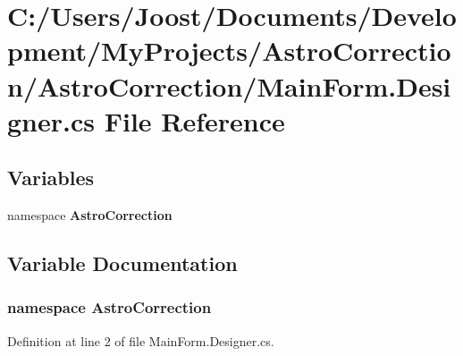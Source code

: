 \section{C:/Users/Joost/Documents/Development/MyProjects/AstroCorrection/AstroCorrection/MainForm.Designer.cs File Reference}
\label{_main_form_8_designer_8cs}
\subsection*{Variables}
\begin{DoxyCompactItemize}
\item 
﻿namespace {\bf AstroCorrection}
\end{DoxyCompactItemize}


\subsection{Variable Documentation}
\subsubsection[{AstroCorrection}]{\setlength{\rightskip}{0pt plus 5cm}﻿namespace AstroCorrection}\label{_main_form_8_designer_8cs_ae380fdafc7c10e7ca4c67864e4f6f820}


Definition at line 2 of file MainForm.Designer.cs.